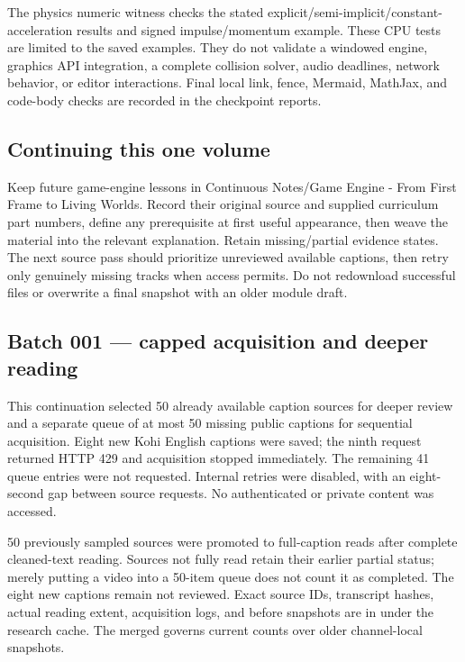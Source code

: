 The physics numeric witness checks the stated explicit/semi-implicit/constant-acceleration results and signed impulse/momentum example. These CPU tests are limited to the saved examples. They do not validate a windowed engine, graphics API integration, a complete collision solver, audio deadlines, network behavior, or editor interactions. Final local link, fence, Mermaid, MathJax, and code-body checks are recorded in the checkpoint reports.

\subsection{Continuing this one volume}\label{appendix-877738f6f4d2-continuing-this-one-volume}

\hypertarget{appendix-877738f6f4d2-continuing-this-one-volume}{}

Keep future game-engine lessons in {Continuous Notes/Game Engine - From First Frame to Living Worlds}. Record their original source and supplied curriculum part numbers, define any prerequisite at first useful appearance, then weave the material into the relevant explanation. Retain missing/partial evidence states. The next source pass should prioritize unreviewed available captions, then retry only genuinely missing tracks when access permits. Do not redownload successful files or overwrite a final snapshot with an older module draft.

\subsection{Batch 001 --- capped acquisition and deeper reading}\label{appendix-877738f6f4d2-batch-001-capped-acquisition-and-deeper-reading}

\hypertarget{appendix-877738f6f4d2-batch-001-capped-acquisition-and-deeper-reading}{}

This continuation selected 50 already available caption sources for deeper review and a separate queue of at most 50 missing public captions for sequential acquisition. Eight new Kohi English captions were saved; the ninth request returned HTTP 429 and acquisition stopped immediately. The remaining 41 queue entries were not requested. Internal retries were disabled, with an eight-second gap between source requests. No authenticated or private content was accessed.

50 previously sampled sources were promoted to full-caption reads after complete cleaned-text reading. Sources not fully read retain their earlier partial status; merely putting a video into a 50-item queue does not count it as completed. The eight new captions remain not reviewed. Exact source IDs, transcript hashes, actual reading extent, acquisition logs, and before snapshots are in  under the research cache. The merged  governs current counts over older channel-local snapshots.

